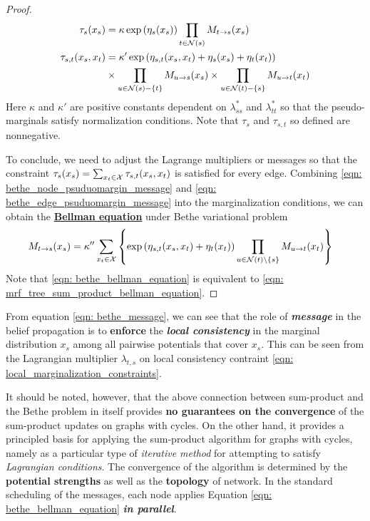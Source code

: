 \documentclass[11pt]{article}
\begin{document}
\begin{proof}
\begin{align} 
\tau_{s}(x_{s}) &=\kappa \exp\left(\eta_{s}(x_{s}) \right)\prod_{t \in {\mathcal N}(s)}M_{t \rightarrow s}(x_s)   \label{eqn: bethe_node_psuduomargin_message}\\
\tau_{s,t}(x_s, x_t) &= \kappa' \exp\left(\eta_{s,t}(x_{s}, x_{t}) +  \eta_{s}(x_{s})+ \eta_{t}(x_{t})\right) \nonumber\\
& \times \prod_{u \in {\mathcal N}(s) - \{t\}}M_{u \rightarrow s}(x_s)  \times  \prod_{u \in {\mathcal N}(t) - \{s\}}M_{u \rightarrow t}(x_t)   \label{eqn: bethe_edge_psuduomargin_message}
\end{align} Here $\kappa$ and $\kappa'$ are positive constants dependent on $\lambda^{*}_{ss}$ and $\lambda^{*}_{tt}$ so that the pseudo-marginals satisfy normalization conditions. Note that $\tau_s$ and $\tau_{s,t}$ so defined are nonnegative.

To conclude, we need to adjust the Lagrange multipliers or messages so that the constraint $\tau_{s}(x_s) = \sum_{x_t \in {\mathcal X}}\tau_{s,t}(x_s, x_t) $ is satisfied for every edge. Combining \eqref{eqn: bethe_node_psuduomargin_message} and \eqref{eqn: bethe_edge_psuduomargin_message} into the marginalization conditions, we can obtain the \underline{\textbf{Bellman equation}} under Bethe variational problem
\begin{align}
M_{t\rightarrow s}(x_s) &= \kappa'' \sum_{x_t \in {\mathcal X}}\left\{\exp\left(\eta_{s,t}(x_{s}, x_{t}) + \eta_{t}(x_{t})\right) \prod_{u \in {\mathcal N}(t) \setminus \{s\}}M_{u \rightarrow t}(x_t)\right\} \label{eqn: bethe_bellman_equation}
\end{align} Note that \eqref{eqn: bethe_bellman_equation} is equivalent to \eqref{eqn: mrf_tree_sum_product_bellman_equation}.
\QEDA
\end{proof}
From equation \eqref{eqn: bethe_message}, we can see that the role of \emph{\textbf{message}} in the belief propagation is to \textbf{enforce} the \emph{\textbf{local consistency}} in the marginal distribution $x_s$ among all pairwise potentials that cover $x_s$. This can be seen from the Lagrangian multiplier $\lambda_{t,s}$ on local consistency contraint \eqref{eqn: local_marginalization_constraints}.

It should be noted, however, that the above connection between sum-product and the Bethe problem in itself provides \textbf{no guarantees on the convergence} of the sum-product updates on graphs with cycles. On the other hand, it provides a principled basis for applying the sum-product algorithm for graphs with cycles, namely as a particular type of \emph{iterative method} for attempting to satisfy \emph{Lagrangian conditions}. The convergence of the algorithm is determined by the \textbf{potential strengths } as well as the \textbf{topology} of network. In the standard scheduling of the messages, each node applies Equation \eqref{eqn: bethe_bellman_equation} \emph{\textbf{in parallel}}.
\end{document}
